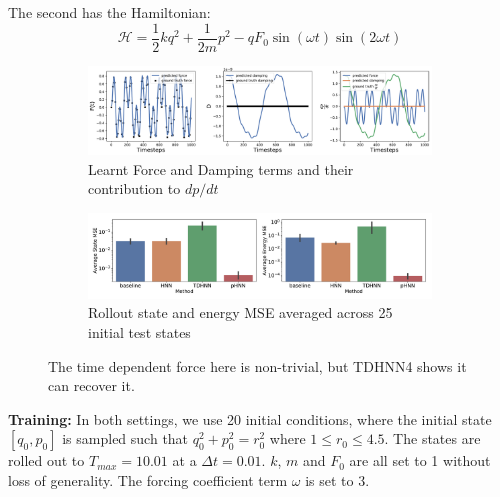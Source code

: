 \documentclass[twoside]{article}
\begin{document}
The second has the Hamiltonian:
\begin{equation}
\mathcal{H} = \frac{1}{2}kq^2 + \frac{1}{2m}p^2 - qF_0\sin(\omega t)\sin(2\omega t)
\end{equation}
\begin{figure}[h!]
\centering
\captionsetup{justification=centering}
	\begin{subfigure}[b]{0.48\textwidth}
		\centering
		\includegraphics[width=\textwidth]{figures/figures/forced_mass_spring/2/forced_mass_spring_dpdt_0.pdf}
		\caption{Learnt Force and Damping terms and their contribution to $dp/dt$}
	\end{subfigure}
	\begin{subfigure}[b]{0.48\textwidth}
	    \centering
		\includegraphics[width=\textwidth]{figures/figures/forced_mass_spring/2/forced_mass_spring_errors_0.pdf}
		\caption{Rollout state and energy MSE averaged across 25 initial test states}
	\end{subfigure}
\caption{The time dependent force here is non-trivial, but TDHNN4 shows it can recover it.}
\label{fig.fmspring2}
\end{figure}
\textbf{Training:} In both settings, we use 20 initial conditions, where the initial state $[q_0,p_0]$ is sampled such that $q_0^2 +p_0^2 =r_0^2$ where $1 \leq r_0 \leq 4.5$. The states are rolled out to $T_{max}=10.01$ at a $\Delta t = 0.01$. $k$, $m$ and $F_0$ are all set to 1 without loss of generality. The forcing coefficient term $\omega$ is set to 3. 
\end{document}
